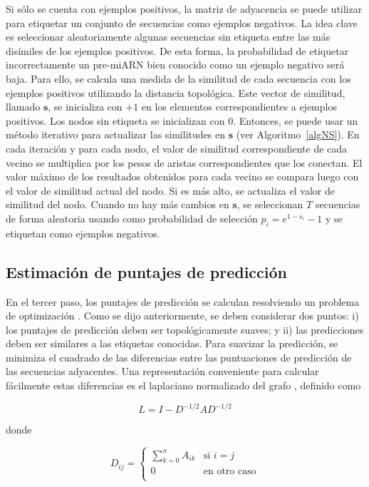 Si sólo se cuenta con ejemplos positivos, la matriz de adyacencia se puede utilizar para etiquetar un conjunto de secuencias como ejemplos negativos. La idea
clave es seleccionar aleatoriamente algunas secuencias sin etiqueta entre las más disímiles de los ejemplos positivos. De esta forma, la probabilidad de
etiquetar incorrectamente un pre-miARN bien conocido como un ejemplo negativo será baja. Para ello, se calcula una medida de la similitud de cada secuencia
con los ejemplos positivos utilizando la distancia topológica. Este vector de similitud, llamado $\mathbf{s}$, se inicializa con $+1$ en los elementos
correspondientes a ejemplos positivos. Los nodos sin etiqueta se inicializan con $0$. Entonces, se puede usar un método iterativo para actualizar las
similitudes en $\mathbf{s}$ (ver Algoritmo~\ref{algNS}). En cada iteración y para cada nodo, el valor de similitud correspondiente de cada vecino se
multiplica por los pesos de aristas correspondientes que los conectan. El valor máximo de los resultados obtenidos para cada vecino se compara luego con el
valor de similitud actual del nodo. Si es más alto, se actualiza el valor de similitud del nodo. Cuando no hay más cambios en $\mathbf{s}$, se seleccionan
$T$ secuencias de forma aleatoria usando como probabilidad de selección $p_{i} = e^{1 - s_{i}} -1$ y se etiquetan como ejemplos negativos.

\subsection{Estimación de puntajes de predicción}

En el tercer paso, los puntajes de predicción se calculan resolviendo un problema de optimización \citep{joachims2003transductive}. Como se dijo
anteriormente, se deben considerar dos puntos: i) los puntajes de predicción deben ser topológicamente suaves; y ii) las predicciones deben ser similares a
las etiquetas conocidas. Para suavizar la predicción, se minimiza el cuadrado de las diferencias entre las puntuaciones de predicción de las secuencias
adyacentes. Una representación conveniente para calcular fácilmente estas diferencias es el laplaciano normalizado del grafo \citep{shi2000normalized}, definido
como

\begin{equation*}
	L=I-D^{-1/2}AD^{-1/2}
\end{equation*}

\noindent donde

\begin{equation*}
	D_{ij} =
	\begin{cases}
		\sum_{k=0}^n A_{ik} & \text{si } i=j \\
		0 & \text{en otro caso} \\
	\end{cases}
\end{equation*}

